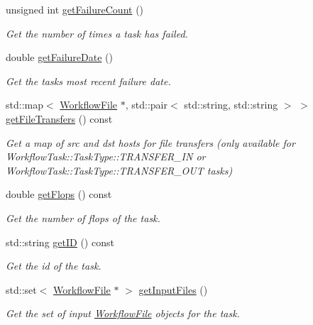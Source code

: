 \begin{DoxyCompactItemize}
unsigned int \hyperlink{classwrench_1_1_workflow_task_a6103d36486855fb8caabb008bcfaacd4}{get\+Failure\+Count} ()
\begin{DoxyCompactList}\small\item\em Get the number of times a task has failed. \end{DoxyCompactList}\item 
double \hyperlink{classwrench_1_1_workflow_task_ae96176bb8e0695833b0e4b6034b36857}{get\+Failure\+Date} ()
\begin{DoxyCompactList}\small\item\em Get the task\textquotesingle{}s most recent failure date. \end{DoxyCompactList}\item 
std\+::map$<$ \hyperlink{classwrench_1_1_workflow_file}{Workflow\+File} $\ast$, std\+::pair$<$ std\+::string, std\+::string $>$ $>$ \hyperlink{classwrench_1_1_workflow_task_a1c453e7b1570418be500c9910372956b}{get\+File\+Transfers} () const
\begin{DoxyCompactList}\small\item\em Get a map of src and dst hosts for file transfers (only available for Workflow\+Task\+::\+Task\+Type\+::\+T\+R\+A\+N\+S\+F\+E\+R\+\_\+\+IN or Workflow\+Task\+::\+Task\+Type\+::\+T\+R\+A\+N\+S\+F\+E\+R\+\_\+\+O\+UT tasks) \end{DoxyCompactList}\item 
double \hyperlink{classwrench_1_1_workflow_task_aec0aab3ed552960729a60d1d3c4a3de2}{get\+Flops} () const
\begin{DoxyCompactList}\small\item\em Get the number of flops of the task. \end{DoxyCompactList}\item 
std\+::string \hyperlink{classwrench_1_1_workflow_task_a18ce8967b4b59d2d231a1218a8d3b813}{get\+ID} () const
\begin{DoxyCompactList}\small\item\em Get the id of the task. \end{DoxyCompactList}\item 
std\+::set$<$ \hyperlink{classwrench_1_1_workflow_file}{Workflow\+File} $\ast$ $>$ \hyperlink{classwrench_1_1_workflow_task_a1baf5564a8a03ec475b42064e1940eaa}{get\+Input\+Files} ()
\begin{DoxyCompactList}\small\item\em Get the set of input \hyperlink{classwrench_1_1_workflow_file}{Workflow\+File} objects for the task. \end{DoxyCompactList}\item 

\end{DoxyCompactItemize}
